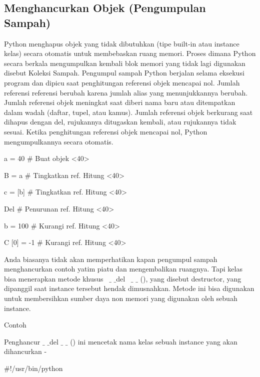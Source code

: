 {\subsection{Menghancurkan Objek (Pengumpulan Sampah)}
Python menghapus objek yang tidak dibutuhkan (tipe built-in atau instance kelas) secara otomatis untuk membebaskan ruang memori. Proses dimana Python secara berkala mengumpulkan kembali blok memori yang tidak lagi digunakan disebut Koleksi Sampah. Pengumpul sampah Python berjalan selama eksekusi program dan dipicu saat penghitungan referensi objek mencapai nol. Jumlah referensi referensi berubah karena jumlah alias yang menunjukkannya berubah. Jumlah referensi objek meningkat saat diberi nama baru atau ditempatkan dalam wadah (daftar, tupel, atau kamus). Jumlah referensi objek berkurang saat dihapus dengan del, rujukannya ditugaskan kembali, atau rujukannya tidak sesuai. Ketika penghitungan referensi objek mencapai nol, Python mengumpulkannya secara otomatis. \par
\vspace{12pt}
\noindent 
a = 40  $  \#  $ Buat objek <40> \par
\noindent 
B = a  $  \#  $ Tingkatkan ref. Hitung <40> \par
\noindent 
c = [b]  $  \#  $ Tingkatkan ref. Hitung <40> \par
\vspace{12pt}
\noindent 
Del  $  \#  $ Penurunan ref. Hitung <40> \par
\noindent 
b = 100  $  \#  $ Kurangi ref. Hitung <40> \par
\noindent 
C [0] = -1  $  \#  $ Kurangi ref. Hitung <40> \par
\vspace{12pt}
\par
Anda biasanya tidak akan memperhatikan kapan pengumpul sampah menghancurkan contoh yatim piatu dan mengembalikan ruangnya. Tapi kelas bisa menerapkan metode khusus  $  \_  $ $  \_  $del  $  \_  $ $  \_ $ (), yang disebut destructor, yang dipanggil saat instance tersebut hendak dimusnahkan. Metode ini bisa digunakan untuk membersihkan sumber daya non memori yang digunakan oleh sebuah instance. \par
\noindent 
Contoh \par
\vspace{12pt}
\noindent 
Penghancur  $  \_  $ $  \_  $del  $  \_  $ $  \_  $ () ini mencetak nama kelas sebuah instance yang akan dihancurkan - \par
\noindent 
 $  \#  $!/usr/bin/python \par
}
